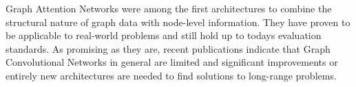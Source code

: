 \label{chapter:related_work}

Graph Attention Networks were among the first architectures to combine the structural nature of graph data with node-level information. They have proven to be applicable to real-world problems and still hold up to todays evaluation standards. As promising as they are, recent publications indicate that Graph Convolutional Networks in general are limited and significant improvements or entirely new architectures are needed to find solutions to long-range problems.